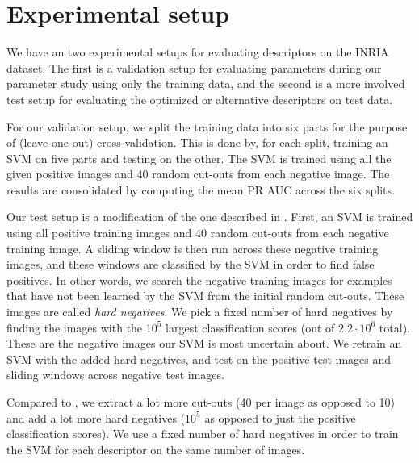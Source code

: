 \documentclass[thesis.tex]{subfiles}
\begin{document}
\section{Experimental setup}
%
We have an two experimental setups for evaluating descriptors on the INRIA dataset. The first is a validation setup for evaluating parameters during our parameter study using only the training data, and the second is a more involved test setup for evaluating the optimized or alternative descriptors on test data.

For our validation setup, we split the training data into six parts for the purpose of (leave-one-out) cross-validation. This is done by, for each split, training an SVM on five parts and testing on the other. The SVM is trained using all the given positive images and 40 random cut-outs from each negative image. The results are consolidated by computing the mean PR AUC across the six splits.

Our test setup is a modification of the one described in \citet{dalal2005histograms}. First, an SVM is trained using all positive training images and 40 random cut-outs from each negative training image. A sliding window is then run across these negative training images, and these windows are classified by the SVM in order to find false positives. In other words, we search the negative training images for examples that have not been learned by the SVM from the initial random cut-outs. These images are called \emph{hard negatives}. We pick a fixed number of hard negatives by finding the images with the $10^5$ largest classification scores (out of $2.2 \cdot 10^6$ total). These are the negative images our SVM is most uncertain about. We retrain an SVM with the added hard negatives, and test on the positive test images and sliding windows across negative test images.

Compared to \citet{dalal2005histograms}, we extract a lot more cut-outs (40 per image as opposed to 10) and add a lot more hard negatives ($10^5$ as opposed to just the positive classification scores). We use a fixed number of hard negatives in order to train the SVM for each descriptor on the same number of images.
\end{document}
